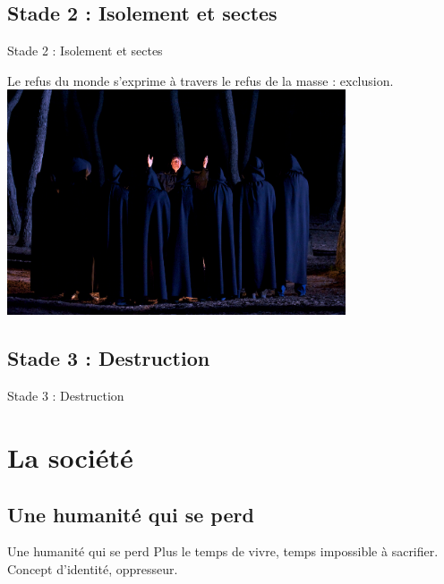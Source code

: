 \documentclass{beamer}
\begin{document}
\subsection{Stade 2 : Isolement et sectes}
\begin{frame}{Stade 2 : Isolement et sectes}
  \begin{center}
    Le refus du monde s'exprime à travers le refus de la masse : exclusion.
    \includegraphics[width=10cm]{../Images/secte.png}
  \end{center}
\end{frame}

\subsection{Stade 3 : Destruction}
\begin{frame}{Stade 3 : Destruction}

\end{frame}


\section{La société}

\subsection{Une humanité qui se perd}
\begin{frame}{Une humanité qui se perd}
  Plus le temps de vivre, temps impossible à sacrifier.
  Concept d'identité, oppresseur.
\end{frame}
\end{document}
